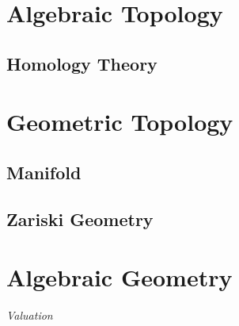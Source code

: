 \documentclass{article}
\begin{document}
\section{Algebraic Topology}\label{sec:algebraic_topology}

\subsection{Homology Theory}\label{subsec:homology_theory}



\section{Geometric Topology}\label{sec:geometric_topology}

\subsection{Manifold}\label{subsec:manifold}

\subsection{Zariski Geometry}\label{subsec:zariski_geometry}



\section{Algebraic Geometry}\label{sec:algebraic_geometry}

\emph{Valuation}



\end{document}
